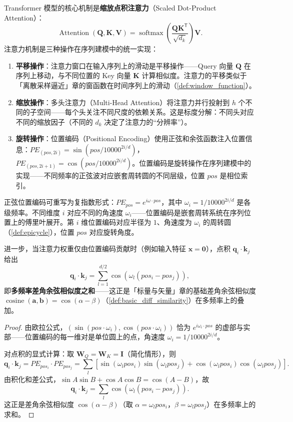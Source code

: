 \begin{definition}[自注意力的周期解释]\label{def:self_attention_periodic}
Transformer 模型的核心机制是\textbf{缩放点积注意力}（Scaled Dot-Product Attention）：
\[
\operatorname{Attention}(\mathbf{Q}, \mathbf{K}, \mathbf{V}) = \operatorname{softmax}\left(\frac{\mathbf{Q}\mathbf{K}^{\mathsf T}}{\sqrt{d_k}}\right) \mathbf{V}.
\]
注意力机制是三种操作在序列建模中的统一实现：
\begin{enumerate}[label=(\roman*)]
    \item \textbf{平移操作}：注意力窗口在输入序列上的滑动是平移操作——Query 向量 $\mathbf{Q}$ 在序列上移动，与不同位置的 Key 向量 $\mathbf{K}$ 计算相似度。注意力的平移类似于「离散采样逼近」章的窗函数在时间序列上的滑动（\cref{def:window_function}）。
    \item \textbf{缩放操作}：多头注意力（Multi-Head Attention）将注意力并行投射到 $h$ 个不同的子空间——每个头关注不同尺度的依赖关系。这是标度分解：不同头对应不同的缩放因子（不同的 $d_k$ 决定了注意力的“分辨率”）。
    \item \textbf{旋转操作}：位置编码（Positional Encoding）使用正弦和余弦函数注入位置信息：$PE_{(pos, 2i)} = \sin(pos/10000^{2i/d})$，$PE_{(pos, 2i+1)} = \cos(pos/10000^{2i/d})$。位置编码是旋转操作在序列建模中的实现——不同频率的正弦波对应嵌套周转圆的不同层级，位置 $pos$ 是相位索引。
\end{enumerate}
\end{definition}

\begin{proposition}[位置编码的傅里叶结构]\label{prop:positional_encoding_fourier}
正弦位置编码可重写为复指数形式：$PE_{pos} = e^{i \omega \cdot pos}$，其中 $\omega_i = 1/10000^{2i/d}$ 是各级频率。不同维度 $i$ 对应不同的角速度 $\omega_i$——位置编码是嵌套周转系统在序列位置上的傅里叶展开。第 $i$ 维位置编码对应半径为 $1$、角速度为 $\omega_i$ 的周转圆（\cref{def:epicycle}），位置 $pos$ 对应旋转角度。

进一步，当注意力权重仅由位置编码贡献时（例如输入特征 $\mathbf{x} = \mathbf{0}$），点积 $\mathbf{q}_i \cdot \mathbf{k}_j$ 给出
\[
\mathbf{q}_i \cdot \mathbf{k}_j = \sum_{l=1}^{d/2} \cos(\omega_l (pos_i - pos_j)),
\]
即\textbf{多频率差角余弦相似度之和}——这正是「标量与矢量」章的基础差角余弦相似度 $\operatorname{cosine}(\mathbf{a},\mathbf{b}) = \cos(\alpha - \beta)$（\cref{def:basic_diff_similarity}）在多频率上的叠加。
\end{proposition}

\begin{proof}
由欧拉公式，$(\sin(pos \cdot \omega_i), \cos(pos \cdot \omega_i))$ 恰为 $e^{i\omega_i \cdot pos}$ 的虚部与实部——位置编码的每一维对是单位圆上的点，角速度 $\omega_i = 1/10000^{2i/d}$。

对点积的显式计算：取 $\mathbf{W}_Q = \mathbf{W}_K = \mathbf{I}$（简化情形），则
\[
\mathbf{q}_i \cdot \mathbf{k}_j = PE_{pos_i} \cdot PE_{pos_j} = \sum_{l} \left[\sin(\omega_l pos_i)\sin(\omega_l pos_j) + \cos(\omega_l pos_i)\cos(\omega_l pos_j)\right].
\]
由积化和差公式，$\sin A\sin B + \cos A\cos B = \cos(A - B)$，故
\[
\mathbf{q}_i \cdot \mathbf{k}_j = \sum_{l} \cos(\omega_l (pos_i - pos_j)).
\]
这正是差角余弦相似度 $\cos(\alpha - \beta)$（取 $\alpha = \omega_l pos_i$，$\beta = \omega_l pos_j$）在多频率上的求和。
\end{proof}

